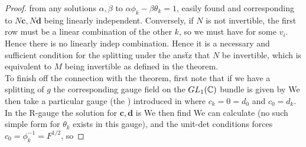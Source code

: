 \documentclass{article}
\begin{document}
\begin{proof}
{} from any solutions $\alpha,\beta$ to $\alpha\phi_k-\beta \theta_k=1$, easily found and corresponding to $N\bm{c}, N\bm{d}$ being linearly independent. Conversely, if $N$ is not invertible, the first row must be a linear combination of the other $k$, so we must have 
for some $v_i$. Hence there is no linearly indep combination. Hence it is a necessary and sufficient condition for the splitting under the ans\"tz that $N$ be invertible, which is equivalent to $M$ being invertible as defined in the theorem. \\
To finish off the connection with the theorem, first note that if we have a splitting of $g$ the corresponding gauge field on the $GL_1(\mathbb{C})$ bundle is given by 
We then take a particular gauge (the ) introduced in \cite{Yang1977} where $c_k = 0 = d_0$ and $c_0 = d_k$. In the R-gauge the solution for $\bm{c}, \bm{d}$ is 
We then find 
We can calculate
(no such simple form for $\theta_k$ exists in this gauge), and the unit-det conditions forces $c_0= \phi_k^{-1} = F^{1/2}$, so 
\end{proof}
\end{document}
